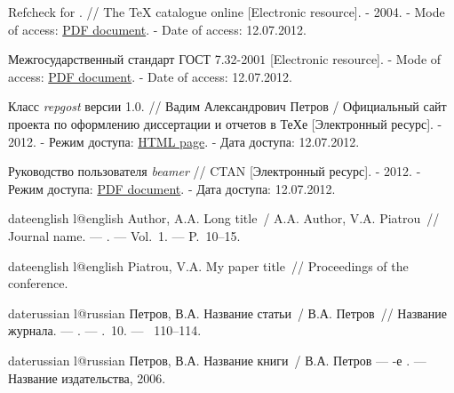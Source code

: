 \begin{thebibliography}{6}
Refcheck for \LaTeXe. //  The \TeX{} catalogue online  [Electronic resource]. - 2004. - Mode of access:
\href{http://www.ctan.org/tex-archive/macros/latex/contrib/refcheck/refdemo.pdf}{PDF document}.  - Date of access: 12.07.2012.

Межгосударственный стандарт ГОСТ 7.32-2001 [Electronic resource]. - Mode of access:
\href{http://txts.mgou.ru/library/stand/20.pdf}{PDF document}.  - Date of access: 12.07.2012.

Класс {\itshape repgost} версии 1.0. // Вадим Александрович Петров / Официальный сайт проекта по оформлению диссертации и отчетов в ТеХе  [Электронный ресурс]. - 2012.
 - Режим доступа: \href{http://thesisby.at.tut.by/repgost.html}{HTML page}. - Дата доступа: 12.07.2012.


Руководство пользователя {\itshape beamer} // CTAN  [Электронный ресурс]. - 2012.
 - Режим доступа: \href{http://www.ctan.org/tex-archive/macros/latex/contrib/beamer/doc/beameruserguide.pdf}{PDF document}. - Дата доступа: 12.07.2012.

\end{thebibliography}


% 
% 

\begin{mybibliography}{8}
\def\selectlanguageifdefined#1{
\expandafter\ifx\csname date#1\endcsname\relax
\else\language\csname l@#1\endcsname\fi}

\selectlanguageifdefined{english}
Author, A.A. Long title~/ A.A. Author, V.A. Piatrou~//
  Journal name. ---
. ---
\newblock Vol.~1. ---
\newblock P.~10--15.

\selectlanguageifdefined{english}
Piatrou, V.A. My paper title~// Proceedings of the conference.

\selectlanguageifdefined{russian}
Петров, В.А. Название статьи~/ В.А. Петров~//
  Название журнала. ---
. ---
\newblock \CYRT.~10. ---
~110--114.

\selectlanguageifdefined{russian}
Петров, В.А. Название книги~/ В.А. Петров ---
-е  {\cyr\cyri\cyrz\cyrd.} ---
\newblock Название издательства, 2006.

\end{mybibliography}
